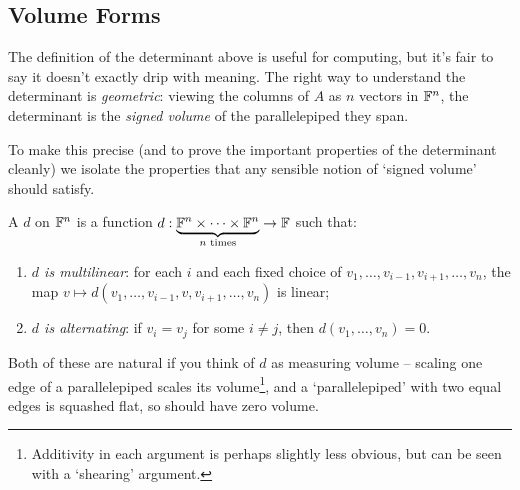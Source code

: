 \documentclass[a4paper]{scrartcl}
\begin{document}
\subsection{Volume Forms}

The definition of the determinant above is useful for computing, but it's fair to say it doesn't exactly drip with meaning. The right way to understand the determinant is \emph{geometric}: viewing the columns of $A$ as $n$ vectors in $\mathbb{F}^n$, the determinant is the \emph{signed volume} of the parallelepiped they span.

\begin{center}
\end{center}

To make this precise (and to prove the important properties of the determinant cleanly) we isolate the properties that any sensible notion of `signed volume' should satisfy.

\begin{definition}
    A  $d$ on $\mathbb{F}^n$ is a function $d: \underbrace{\mathbb{F}^n \times \cdots \times \mathbb{F}^n}_{n \text{ times}} \rightarrow \mathbb{F}$ such that:
    \begin{enumerate}[label=(\roman*)]
        \item \emph{$d$ is multilinear}: for each $i$ and each fixed choice of $v_1, \dots, v_{i - 1}, v_{i + 1}, \dots, v_n$, the map $v \mapsto d(v_1, \dots, v_{i-1}, v, v_{i + 1}, \dots, v_n)$ is linear;
        \item \emph{$d$ is alternating}: if $v_i = v_j$ for some $i \neq j$, then $d(v_1, \dots, v_n) = 0$.
    \end{enumerate}
\end{definition}

Both of these are natural if you think of $d$ as measuring volume -- scaling one edge of a parallelepiped scales its volume\footnote{Additivity in each argument is perhaps slightly less obvious, but can be seen with a `shearing' argument.}, and a `parallelepiped' with two equal edges is squashed flat, so should have zero volume.
\end{document}
